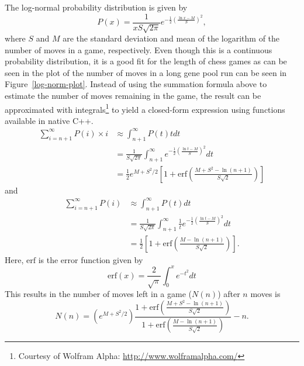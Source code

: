 \documentclass[letterpaper]{article}
\newcommand{\cpp}{C{\nobreak+}{\nobreak+}}
\renewcommand{\_}{\allowbreak\textunderscore\allowbreak}
\begin{document}
The log-normal probability distribution is given by
\[P(x) = \frac{1}{xS\sqrt{2\pi}} e^{-\frac{1}{2}{\left(\frac{\ln{x} - M}{S}\right)}^2},\]
where \(S\) and \(M\) are the standard deviation and mean of the logarithm of the number of moves in a game, respectively. Even though this is a continuous probability distribution, it is a good fit for the length of chess games as can be seen in the plot of the number of moves in a long gene pool run can be seen in Figure~\ref{log-norm-plot}. Instead of using the summation formula above to estimate the number of moves remaining in the game, the result can be approximated with integrals\footnote{Courtesy of Wolfram Alpha: \url{http://www.wolframalpha.com/}} to yield a closed-form expression using functions available in native \cpp.
\begin{align*}
\sum_{i = n + 1}^\infty P(i)\times{}i &\approx \int_{n+1}^\infty P(t)t dt \\
	&= \frac{1}{S\sqrt{2\pi}} \int_{n+1}^\infty e^{-\frac{1}{2}{\left(\frac{\ln{t} - M}{S}\right)}^2}dt\\
	&= \frac{1}{2}e^{M + S^2/2}{\left[1 + \textrm{erf}{\left(\frac{M + S^2 - \ln (n+1)}{S\sqrt{2}}\right)}\right]}
\end{align*}
and
\begin{align*}
\sum_{i = n + 1}^\infty P(i) &\approx \int_{n+1}^\infty P(t)dt \\
	&= \frac{1}{S\sqrt{2\pi}} \int_{n+1}^\infty \frac{1}{t} e^{-\frac{1}{2}{\left(\frac{\ln{t} - M}{S}\right)}^2}dt \\
	&= \frac{1}{2}\left[1 + \textrm{erf}\left(\frac{M-\ln (n+1)}{S\sqrt{2}}\right)\right].
\end{align*}
Here, \(\textrm{erf}\) is the error function given by
\[
\textrm{erf}(x) = \frac{2}{\sqrt{\pi}}\int_0^x e^{-t^2}dt
\]
This results in the number of moves left in a game (\(N(n)\)) after \(n\) moves is
\[
N(n) = \left(e^{M + S^2/2}\right) \frac
{1 + \textrm{erf}\left(\frac{M + S^2 - \ln (n+1)}{S\sqrt{2}}\right)}
{1 + \textrm{erf}\left(\frac{M-\ln (n+1)}{S\sqrt{2}}\right)}
- n.
\]
\end{document}
